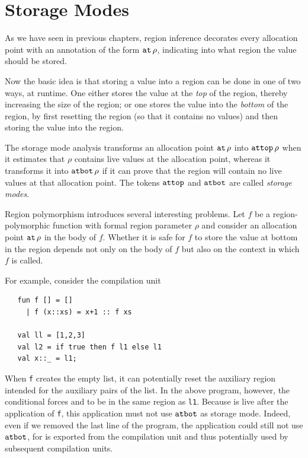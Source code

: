 \documentclass[12pt]{book}
\begin{document}
\section{Storage Modes}
As we have seen in previous chapters, region inference decorates every
%
%
allocation point with an annotation of the form $\mathbin{\hbox{\tt at}}\,\rho$,
indicating into what region the value should be stored.

Now the basic idea is that storing a value into a region can be done
in one of two ways, at runtime. One either stores the value at the 
%
{\em top\/} of the region, thereby increasing the size of the region;
or one stores the value into the
%
{\em bottom\/} of the region, by first resetting the region (so that
it contains no values) and then storing the value into the region.

The storage mode analysis transforms an allocation point $\mathbin{\hbox{\tt at}}\,\rho$
into
%
$\hbox{\tt attop}\,\rho$ when it estimates that $\rho$ contains live values at
the allocation point, whereas it transforms it into
%
$\hbox{\tt atbot}\,\rho$ if it can prove that the region will contain no live
values at that allocation point. The tokens $\hbox{\tt attop}$ and $\hbox{\tt atbot}$ are
called
%
{\em storage modes}.

%
Region polymorphism introduces several interesting problems. Let $f$
be a region-polymorphic function with formal region parameter $\rho$
and consider an allocation point $\mathbin{\hbox{\tt at}}\,\rho$ in the body of $f$.
Whether it is safe for $f$ to store the value at bottom in the region
depends not only on the body of $f$ but also on the context in which
$f$ is called.

For example, consider the compilation unit
\begin{verbatim}
   fun f [] = []
     | f (x::xs) = x+1 :: f xs

   val ll = [1,2,3]
   val l2 = if true then f l1 else l1
   val x::_ = l1;
\end{verbatim}
When {\tt f} creates the empty list, it can potentially reset the 
%
auxiliary region intended for the 
%
auxiliary pairs of the list. In the above program, however, the
conditional forces  and  to be in the same
region as {\tt l1}.  Because  is live after the application
of {\tt f}, this application must not use $\hbox{\tt atbot}$ as storage mode.
Indeed, even if we removed the last line of the program, the
application could still not use $\hbox{\tt atbot}$, for  is exported
from the compilation unit and thus potentially used by subsequent
compilation units.
\end{document}
